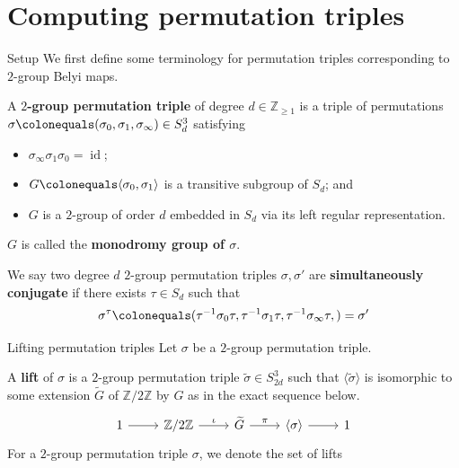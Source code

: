 \documentclass[xcolor=dvipsnames]{beamer}
\theoremstyle{plain}
\newcommand{\ZZ}{\mathbb Z}
\newcommand{\wt}[1]{\widetilde{#1}}
\DeclareMathOperator{\id}{id}
\begin{document}
  \section{Computing permutation triples}{
    \begin{frame}{Setup}
      We first define some terminology for
      permutation triples corresponding
      to $2$-group Belyi maps.
      \pause\par
      A \textbf{$2$-group permutation triple}
      of degree $d\in\ZZ_{\geq 1}$ is a triple
      of permutations
      $\sigma\colonequals(\sigma_0,\sigma_1,\sigma_\infty)
      \in S_d^3$ satisfying
      \begin{itemize}
        \item
          $\sigma_\infty\sigma_1\sigma_0=\id$;
        \item
          $G\colonequals\langle\sigma_0,\sigma_1\rangle$
          is a transitive subgroup of $S_d$; and
        \item
          $G$ is a $2$-group of order $d$
          embedded in $S_d$
          via its left regular representation.
      \end{itemize}
      \pause
      $G$ is called the \textbf{monodromy group of $\sigma$}.
      \pause\par
      We say two degree $d$
      $2$-group permutation triples $\sigma,\sigma'$
      are \textbf{simultaneously conjugate} if there exists
      $\tau\in S_d$ such that
      \[
        \sigma^\tau\colonequals
        (
          \tau^{-1}\sigma_0\tau,
          \tau^{-1}\sigma_1\tau,
          \tau^{-1}\sigma_\infty\tau,
        )
        =\sigma'
      \]
    \end{frame}
    \begin{frame}[fragile]{Lifting permutation triples}
      Let $\sigma$ be a $2$-group permutation triple.
      \pause\par
      A \textbf{lift} of $\sigma$ is
      a $2$-group permutation triple
      $\wt{\sigma}\in S_{2d}^3$
      such that
      $\langle\wt{\sigma}\rangle$
      is isomorphic to some extension
      $\wt{G}$
      of $\ZZ/2\ZZ$ by $G$
      as in the exact sequence below.
      \[
        \begin{tikzcd}
          1\arrow{r}&\ZZ/2\ZZ\arrow{r}{\iota}
                    &\wt{G}\arrow{r}{\pi}
                    &\langle\sigma\rangle\arrow{r}
                    &1
        \end{tikzcd}
      \]
      \pause
      For a $2$-group permutation triple
      $\sigma$, we denote the set of lifts

\end{frame}}
\end{document}
